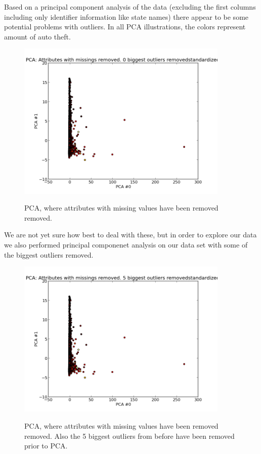 
Based on a principal component analysis of the data (excluding the first columns including only identifier information like state names) there appear to be some potential problems with outliers. In all PCA illustrations, the colors represent amount of auto theft.

\begin{figure}[H]
\centering
\includegraphics[width=0.9\textwidth]{pca/attr-with-missings-removed_0-biggest-outliers-removed_standrd_}
\label{fig:prenorm_attrrem_0out}
\caption{PCA, where attributes with missing values have been removed removed.}
\end{figure}

We are not yet sure how best to deal with these, but in order to explore our data we also performed principal componenet analysis on our data set with some of the biggest outliers removed.

\begin{figure}[H]
\centering
\includegraphics[width=0.9\textwidth]{pca/attr-with-missings-removed_5-biggest-outliers-removed_standrd_}
\label{fig:prenorm_attrrem_0out}
\caption{PCA, where attributes with missing values have been removed removed. Also the 5 biggest outliers from before have been removed prior to PCA.}
\end{figure}

